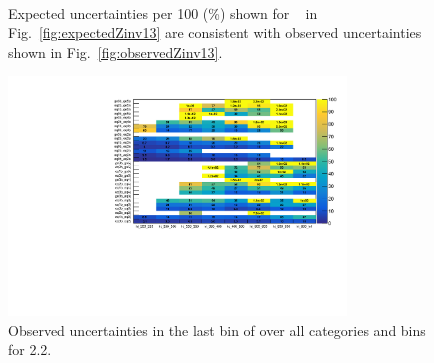 \begin{figure}[h!]
  \centering
  ~~
  \\
  \caption{\label{fig:expectedObservedZinv13} Expected uncertainties per 100 \GeV (\%) shown for \zInv~ in Fig.~\ref{fig:expectedZinv13} are consistent
  with observed uncertainties shown in Fig.~\ref{fig:observedZinv13}.}
\end{figure}
\begin{figure}[h!]
  \centering
  \includegraphics[width=0.8\textwidth]{figures/template13TeV/2p2fb/frenchFlagLastBin.pdf}
  \caption{\label{fig:frenchFlagLastBin} Observed uncertainties in the 
  last bin of \mht over all categories and \scalht bins for 2.2\ifb.}
\end{figure}
\newpage
